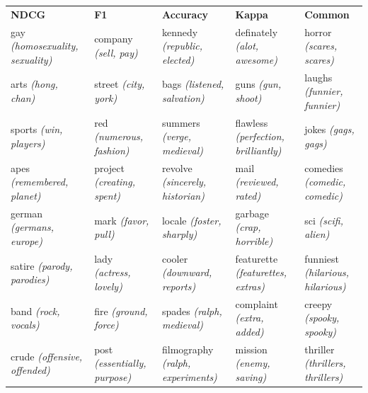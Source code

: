\begin{landscape}
	\begin{table}[]
		\scriptsize
		\begin{tabular}{lllll}
			\textbf{NDCG}                     & \textbf{F1}            		     & \textbf{Accuracy}    				   & \textbf{Kappa}                     & \textbf{Common}                               \\
			gay \textit{(homosexuality, sexuality)}    & company \textit{(sell, pay)}              & kennedy \textit{(republic, elected)}             & definately \textit{(alot, awesome)}         & horror \textit{(scares, scares)}              \\
			arts \textit{(hong, chan)}                 & street \textit{(city, york)}              & bags \textit{(listened, salvation)}              & guns \textit{(gun, shoot)}                  & laughs \textit{(funnier, funnier)}            \\
			sports \textit{(win, players)}             & red \textit{(numerous, fashion)}          & summers \textit{(verge, medieval)}               & flawless \textit{(perfection, brilliantly)} & jokes \textit{(gags, gags)}                   \\
			apes \textit{(remembered, planet)}         & project \textit{(creating, spent)}        & revolve \textit{(sincerely, historian)}          & mail \textit{(reviewed, rated)}             & comedies \textit{(comedic, comedic)}          \\
			german \textit{(germans, europe)}          & mark \textit{(favor, pull)}               & locale \textit{(foster, sharply)}                & garbage \textit{(crap, horrible)}           & sci \textit{(scifi, alien)}                   \\
			satire \textit{(parody, parodies)}         & lady \textit{(actress, lovely)}           & cooler \textit{(downward, reports)}              & featurette \textit{(featurettes, extras)}   & funniest \textit{(hilarious, hilarious)}      \\
			band \textit{(rock, vocals)}               & fire \textit{(ground, force)}             & spades \textit{(ralph, medieval)}                & complaint \textit{(extra, added)}           & creepy \textit{(spooky, spooky)}              \\
			crude \textit{(offensive, offended)}       & post \textit{(essentially, purpose)}      & filmography \textit{(ralph, experiments)}        & mission \textit{(enemy, saving)}            & thriller \textit{(thrillers, thrillers)}      \\

\end{tabular}
\end{table}
\end{landscape}

